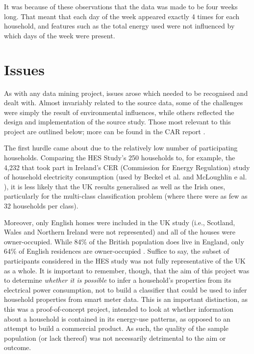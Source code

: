 It was because of these observations that the data was made to be four weeks long. That meant that each day of the week appeared exactly 4 times for each household, and features such as the total energy used were not influenced by which days of the week were present.

\householdOneWeek
\householdPlot




\section{Issues}

As with any data mining project, issues arose which needed to be recognised and dealt with.  Almost invariably related to the source data, some of the challenges were simply the result of environmental influences, while others reflected the design and implementation of the source study.  Those most relevant to this project are outlined below; more can be found in the CAR report \cite{early_findings}.

The first hurdle came about due to the relatively low number of participating households. Comparing the HES Study's 250 households to, for example, the 4,232 that took part in Ireland's CER (Commission for Energy Regulation) study of household electricity consumption\cite{ISSDA} (used by  Beckel et al. and McLoughlin e al. \cite{Beckel_1,Beckel_2,Beckel_3,McLoughlin}), it is less likely that the UK results generalised as well as the Irish ones, particularly for the multi-class classification problem (where there were as few as 32 households per class). 

Moreover, only English homes were included in the UK study (i.e., Scotland, Wales and Northern Ireland were not represented) and all of the houses were owner-occupied.  While 84\% of the British population does live in England, only 64\% of English residences are owner-occupied \cite{ONS}. Suffice to say, the subset of participants considered in the HES study was not fully representative of the UK as a whole. It is important to remember, though, that the aim of this project was to determine \textit{whether it is possible} to infer a household's properties from its electrical power consumption, not to build a classifier that could be used to infer household properties from smart meter data. This is an important distinction, as this was a proof-of-concept project, intended to look at whether information about a household is contained in its energy-use patterns, as opposed to an attempt to build a commercial product.  As such, the quality of the sample population (or lack thereof) was not necessarily detrimental to the aim or outcome.


